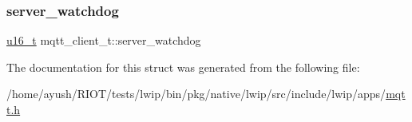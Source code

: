 \mbox{\label{structmqtt__client__t_aa0e3555ddd793ead6f731aa76c0eea6d}} 
\subsubsection{\texorpdfstring{server\+\_\+watchdog}{server\_watchdog}}
{\footnotesize\ttfamily \hyperlink{group__compiler__abstraction_ga77570ac4fcab86864fa1916e55676da2}{u16\+\_\+t} mqtt\+\_\+client\+\_\+t\+::server\+\_\+watchdog}



The documentation for this struct was generated from the following file\+:\begin{DoxyCompactItemize}
\item 
/home/ayush/\+R\+I\+O\+T/tests/lwip/bin/pkg/native/lwip/src/include/lwip/apps/\hyperlink{native_2lwip_2src_2include_2lwip_2apps_2mqtt_8h}{mqtt.\+h}\end{DoxyCompactItemize}
